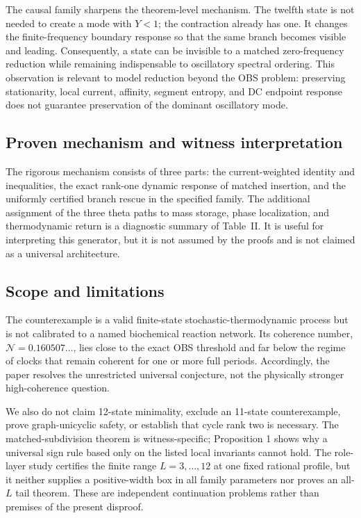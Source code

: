 \documentclass[aps,pre,reprint,groupedaddress,nofootinbib,showkeys,floatfix]{revtex4-2}
\newcommand{\Ncoh}{\mathcal N}
\begin{document}
The causal family sharpens the theorem-level mechanism. The twelfth state is not needed to create a mode with $Y<1$; the contraction already has one. It changes the finite-frequency boundary response so that the same branch becomes visible and leading. Consequently, a state can be invisible to a matched zero-frequency reduction while remaining indispensable to oscillatory spectral ordering. This observation is relevant to model reduction beyond the OBS problem: preserving stationarity, local current, affinity, segment entropy, and DC endpoint response does not guarantee preservation of the dominant oscillatory mode.

\subsection{Proven mechanism and witness interpretation}
The rigorous mechanism consists of three parts: the current-weighted identity and inequalities, the exact rank-one dynamic response of matched insertion, and the uniformly certified branch rescue in the specified family. The additional assignment of the three theta paths to mass storage, phase localization, and thermodynamic return is a diagnostic summary of Table~II. It is useful for interpreting this generator, but it is not assumed by the proofs and is not claimed as a universal architecture.

\subsection{Scope and limitations}
The counterexample is a valid finite-state stochastic-thermodynamic process but is not calibrated to a named biochemical reaction network. Its coherence number, $\Ncoh=0.160507\ldots$, lies close to the exact OBS threshold and far below the regime of clocks that remain coherent for one or more full periods. Accordingly, the paper resolves the unrestricted universal conjecture, not the physically stronger high-coherence question.

We also do not claim 12-state minimality, exclude an 11-state counterexample, prove graph-unicyclic safety, or establish that cycle rank two is necessary. The matched-subdivision theorem is witness-specific; Proposition 1 shows why a universal sign rule based only on the listed local invariants cannot hold. The role-layer study certifies the finite range $L=3,\ldots,12$ at one fixed rational profile, but it neither supplies a positive-width box in all family parameters nor proves an all-$L$ tail theorem. These are independent continuation problems rather than premises of the present disproof.
\end{document}
